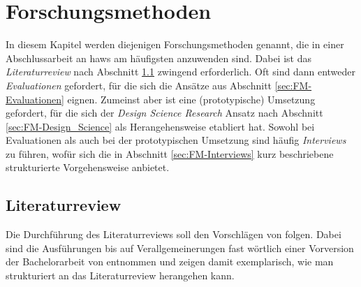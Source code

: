 \chapter{Forschungsmethoden}
\label{cha:Forschungsmethoden}
%
In diesem Kapitel werden diejenigen Forschungsmethoden genannt, die in einer Abschlussarbeit an
\glspl{haw} am häufigsten anzuwenden sind. Dabei ist das \emph{Literaturreview} nach Abschnitt
\ref{sec:FM-Literaturreview} zwingend erforderlich. Oft sind dann entweder \emph{Evaluationen} gefordert,
für die sich die Ansätze aus Abschnitt \ref{sec:FM-Evaluationen} eignen. Zumeinst aber ist eine
(prototypische) Umsetzung gefordert, für die sich der \emph{Design Science Research} Ansatz nach
Abschnitt \ref{sec:FM-Design_Science} als Herangehensweise etabliert hat. Sowohl bei Evaluationen
als auch bei der prototypischen Umsetzung sind häufig \emph{Interviews} zu führen, wofür sich die
in Abschnitt \ref{sec:FM-Interviews} kurz beschriebene strukturierte Vorgehensweise anbietet.
%
\section{Literaturreview}
\label{sec:FM-Literaturreview}
%
Die Durchführung des Literaturreviews soll den Vorschlägen von \textcite{Webster2002} folgen.
Dabei sind die Ausführungen bis auf Verallgemeinerungen fast wörtlich einer Vorversion der Bachelorarbeit von 
\textcite{Riedel2018} entnommen und zeigen damit exemplarisch, wie man strukturiert an
das Literaturreview herangehen kann.

